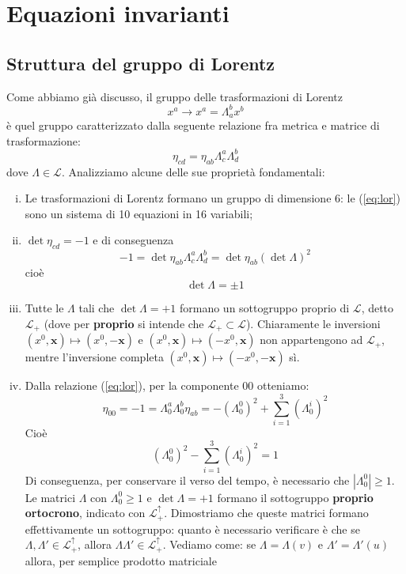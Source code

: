 \documentclass[a4paper,11pt]{book}
\theoremstyle{plain}
\theoremstyle{definition}
\begin{document}
\chapter{Equazioni invarianti}
\section{Struttura del gruppo di Lorentz}
Come abbiamo già discusso, il gruppo delle trasformazioni di Lorentz 
\[
x^a \to x^a = \Lambda_a^b x^b 
\]
è quel gruppo caratterizzato dalla seguente relazione fra metrica e matrice di trasformazione:
\begin{equation}\label{eq:lor}
\eta_{cd}=\eta_{ab}\Lambda_c^a\Lambda_d^b
\end{equation}
dove $\Lambda\in\mathcal{L}$. Analizziamo alcune delle sue proprietà fondamentali:
\begin{enumerate}[i.]
	\item Le trasformazioni di Lorentz formano un gruppo di dimensione 6: le (\ref{eq:lor}) sono un sistema di 10 equazioni in 16 variabili;
	\item $\det \eta_{cd} = -1$ e di conseguenza
	\[
	-1 = \det \eta_{ab} \Lambda_c^a\Lambda_d^b = \det \eta_{ab} (\det \Lambda)^2
	\]
	cioè
	\begin{equation}\label{eq:detlor}
	\det\Lambda = \pm 1
	\end{equation}
	\item Tutte le $\Lambda$ tali che $\det\Lambda=+1$ formano un sottogruppo proprio di $\mathcal{L}$, detto $\mathcal{L}_+$ (dove per \textbf{proprio} si intende che $\mathcal{L}_+ \subset \mathcal{L}$). Chiaramente le inversioni $(x^0, \textbf{x}) \mapsto (x^0,-\textbf{x})$ e $(x^0, \textbf{x}) \mapsto (-x^0,\textbf{x})$ non appartengono ad $\mathcal{L}_+$, mentre l'inversione completa $(x^0, \textbf{x}) \mapsto (-x^0,-\textbf{x})$ sì. 
	\item Dalla relazione (\ref{eq:lor}), per la componente $00$ otteniamo:
	\[
	\eta_{00} = -1 = \Lambda_0^a\Lambda_0^b\eta_{ab} = -(\Lambda^0_0)^2+\sum_{i=1}^3 (\Lambda_0^i)^2
	\]
	Cioè 
	\begin{equation}
	(\Lambda_0^0)^2 - \sum_{i=1}^3 (\Lambda_0^i)^2 = 1
	\end{equation}
	Di conseguenza, per conservare il verso del tempo, è necessario che $|\Lambda_0^0|\geq 1$. Le matrici $\Lambda$ con $\Lambda_0^0\geq 1$ e $\det \Lambda = +1$ formano il sottogruppo \textbf{proprio ortocrono}, indicato con $\mathcal{L}_+^{\uparrow}$. Dimostriamo che queste matrici formano effettivamente un sottogruppo: quanto è necessario verificare è che se $\Lambda,\Lambda' \in \mathcal{L}_+^{\uparrow}$, allora $\Lambda\Lambda'\in \mathcal{L}_+^{\uparrow}$. Vediamo come: se $\Lambda = \Lambda(v)$ e $\Lambda' = \Lambda'(u)$ allora, per semplice prodotto matriciale

\end{enumerate}
\end{document}
